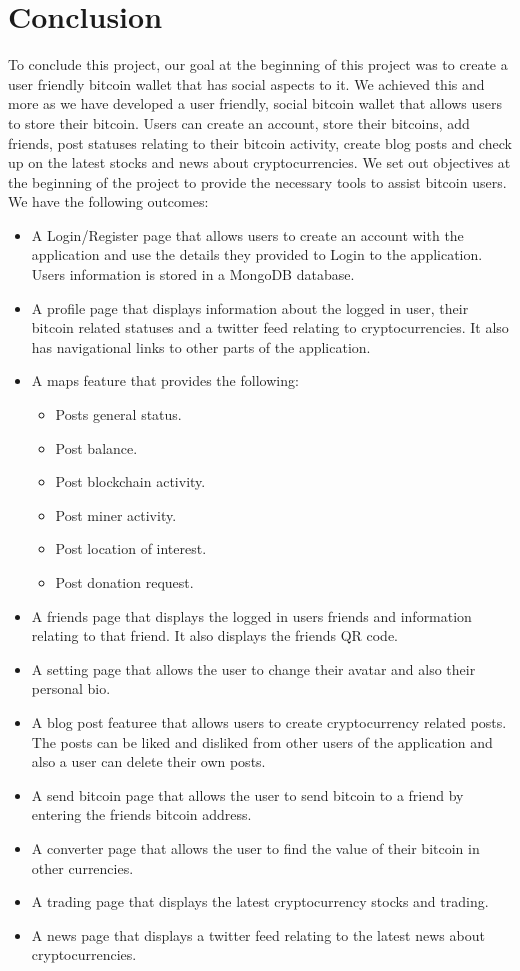 \chapter{Conclusion}
To conclude this project, our goal at the beginning of this project was to create a user friendly bitcoin wallet that has social aspects to it. We achieved this and more as we have developed a user friendly, social bitcoin wallet that allows users to store their bitcoin. Users can create an account, store their bitcoins, add friends, post statuses relating to their bitcoin activity, create blog posts and check up on the latest stocks and news about cryptocurrencies. We set out objectives at the beginning of the project to provide the necessary tools to assist bitcoin users. We have the following outcomes:
\begin{itemize}
    \item A Login/Register page that allows users to create an account with the application and use the details they provided to Login to the application. Users information is stored in a MongoDB database.
    \item A profile page that displays information about the logged in user, their bitcoin related statuses and a twitter feed relating to cryptocurrencies. It also has navigational links to other parts of the application.
    \item A maps feature that provides the following:
       \begin{itemize}
         \item Posts general status.
         \item Post balance.
         \item Post blockchain activity.
         \item Post miner activity.
         \item Post location of interest.
         \item Post donation request.
       \end{itemize}
       
    \item A friends page that displays the logged in users friends and information relating to that friend. It also displays the friends QR code.
    \item A setting page that allows the user to change their avatar and also their personal bio.
    \item A blog post featuree that allows users to create cryptocurrency related posts. The posts can be liked and disliked from other users of the application and also a user can delete their own posts.
    \item A send bitcoin page that allows the user to send bitcoin to a friend by entering the friends bitcoin address.
    \item A converter page that allows the user to find the value of their bitcoin in other currencies.
    \item A trading page that displays the latest cryptocurrency stocks and trading.
    \item A news page that displays a twitter feed relating to the latest news about cryptocurrencies.
\end{itemize}

